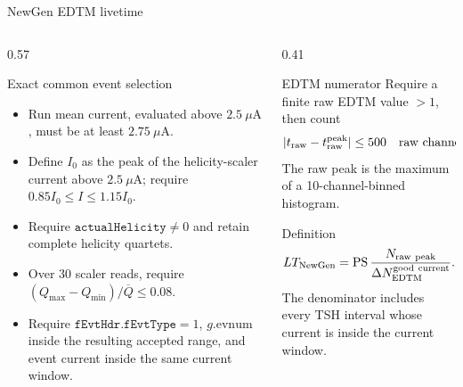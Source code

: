 \documentclass[aspectratio=169,11pt]{beamer}
\begin{document}
\begin{frame}{NewGen EDTM livetime}
\begin{columns}[T,onlytextwidth]
  \begin{column}{0.57\textwidth}
    \begin{block}{Exact common event selection}
    \small
    \begin{itemize}\setlength\itemsep{1.2mm}
      \item Run mean current, evaluated above \(2.5~\mu\mathrm{A}\), must be at least \(2.75~\mu\mathrm{A}\).
      \item Define \(I_0\) as the peak of the helicity-scaler current above \(2.5~\mu\mathrm{A}\); require \(0.85I_0\le I\le1.15I_0\).
      \item Require \(\texttt{actualHelicity}\neq0\) and retain complete helicity quartets.
      \item Over 30 scaler reads, require
      \(\left(Q_{\max}-Q_{\min}\right)/\overline Q\le0.08\).
      \item Require \(\texttt{fEvtHdr.fEvtType}=1\), \(g.\mathrm{evnum}\) inside the resulting accepted range, and event current inside the same current window.
    \end{itemize}
    \end{block}
  \end{column}
  \begin{column}{0.41\textwidth}
    \begin{block}{EDTM numerator}
    \small
    Require a finite raw EDTM value \(>1\), then count
    \[
      |t_{\rm raw}-t_{\rm raw}^{\rm peak}|\le500
      \quad\text{raw channels}. 
    \]
    The raw peak is the maximum of a 10-channel-binned histogram.
    \end{block}
    \begin{block}{Definition}
    \small
    \[
      LT_{\rm NewGen}=
      \mathrm{PS}\,
      \frac{N_{\rm raw\ peak}}
           {\Delta N_{\rm EDTM}^{\rm good\ current}}.
    \]
    \scriptsize The denominator includes every TSH interval whose current is inside the current window.
    \end{block}
  \end{column}
\end{columns}
\end{frame}
\end{document}

